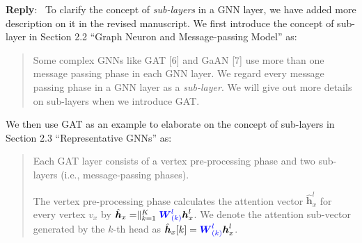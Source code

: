 \documentclass[12pt]{article}
\newcommand{\MyVec}[1]{\boldsymbol{#1}}
\newcommand{\MyMat}[1]{\boldsymbol{#1}}
\newcommand{\hvec}[1]{\hat{\boldsymbol{h}}_{#1}}
\newcommand{\Param}[1]{\textcolor{blue}{#1}}
\newenvironment{reply}
   {\medskip \noindent \textbf{Reply}:\  }
   {\medskip}
\begin{document}
\begin{reply}
    To clarify the concept of \emph{sub-layers} in a GNN layer, we have added more description on it in the revised manuscript.
    We first introduce the concept of sub-layer in Section 2.2 ``Graph Neuron and Message-passing Model'' as:
    \begin{quote}
        Some complex GNNs like GAT [6] and GaAN [7] use more than one message passing phase in each GNN layer.
        We regard every message passing phase in a GNN layer as a \emph{sub-layer}.
        We will give out more details on sub-layers when we introduce GAT.
    \end{quote}
    We then use GAT as an example to elaborate on the concept of sub-layers in Section 2.3 ``Representative GNNs'' as:
    \begin{quote}
        \newcommand{\GATCalcWeight}{\exp(LeakyReLU(\Param{\MyVec{a}}^T[\hvec{y}[k] \parallel \hvec{x}[k]]))}
        Each GAT layer consists of a vertex pre-processing phase and two sub-layers (i.e., message-passing phases).
        
        The vertex pre-processing phase calculates the attention vector $\hat{\boldsymbol{h}}^{l}_{x}$ for every vertex $v_x$ by $\hvec{x} = \parallel_{k=1}^K \Param{\MyMat{W}^l_{(k)}}\MyVec{h}^l_x$. We denote the attention sub-vector generated by the $k$-th head as $\hvec{x}[k]=\Param{\MyMat{W}^l_{(k)}}\MyVec{h}^l_x$.
        

\end{quote}
\end{reply}
\end{document}
